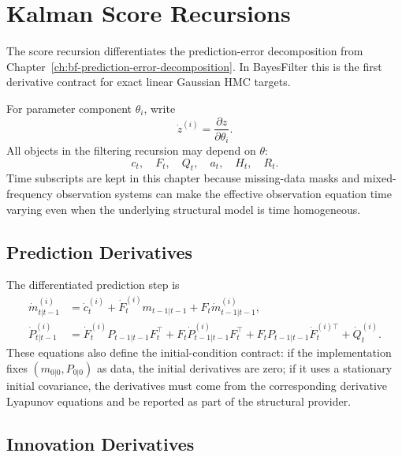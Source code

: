 \chapter{Kalman Score Recursions}
\label{ch:bf-kalman-score}

The score recursion differentiates the prediction-error decomposition from
Chapter~\ref{ch:bf-prediction-error-decomposition}.  In BayesFilter this is the
first derivative contract for exact linear Gaussian HMC targets.

For parameter component $\theta_i$, write
\[
  \dot z^{(i)} = \frac{\partial z}{\partial \theta_i}.
\]
All objects in the filtering recursion may depend on $\theta$:
\[
  c_t,\quad F_t,\quad Q_t,\quad a_t,\quad H_t,\quad R_t.
\]
Time subscripts are kept in this chapter because missing-data masks and
mixed-frequency observation systems can make the effective observation equation
time varying even when the underlying structural model is time homogeneous.

\section{Prediction Derivatives}
\label{sec:bf-score-prediction-derivatives}

The differentiated prediction step is
\begin{align}
\label{eq:bf-score-predicted-mean-first}
  \dot m_{t|t-1}^{(i)}
  &=
  \dot c_t^{(i)}
  +\dot F_t^{(i)}m_{t-1|t-1}
  +F_t\dot m_{t-1|t-1}^{(i)},\\
\label{eq:bf-score-predicted-cov-first}
  \dot P_{t|t-1}^{(i)}
  &=
  \dot F_t^{(i)}P_{t-1|t-1}F_t^\top
  +F_t\dot P_{t-1|t-1}^{(i)}F_t^\top
  +F_tP_{t-1|t-1}\dot F_t^{(i)\top}
  +\dot Q_t^{(i)}.
\end{align}
These equations also define the initial-condition contract: if the
implementation fixes $(m_{0|0},P_{0|0})$ as data, the initial derivatives are
zero; if it uses a stationary initial covariance, the derivatives must come from
the corresponding derivative Lyapunov equations and be reported as part of the
structural provider.

\section{Innovation Derivatives}
\label{sec:bf-score-innovation-derivatives}

